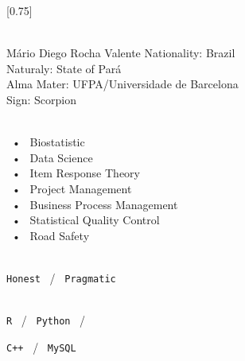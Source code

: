 \documentclass[lighthipster]{simplehipstercv}
\begin{document}
\setlength{\columnsep}{1.5cm}
[0.75]
\begin{paracol}{2}

\paracolbackgroundoptions



\footnotesize
{\setasidefontcolour
\flushright
\begin{center}
\end{center}



{\footnotesize }
\bigskip

 \\[0.5em]
Mário Diego Rocha Valente
Nationality: Brazil \\
Naturaly: State of Pará \\
Alma Mater: UFPA/Universidade de Barcelona \\
Sign: Scorpion

\bigskip

 \\[0.5em]


~•~ Biostatistic \\
~•~ Data Science \\
~•~ Item Response Theory \\
~•~ Project Management \\
~•~ Business Process Management \\
~•~ Statistical Quality Control \\
~•~ Road Safety \\



\bigskip

\\[0.5em]

\texttt{Honest} ~/~ \texttt{Pragmatic}  


\bigskip

\\[0.5em]

\texttt{R} ~/~ \texttt{Python} ~/~ 

\texttt{C++} ~/~  \texttt{MySQL}



}
\end{paracol}
\end{document}
